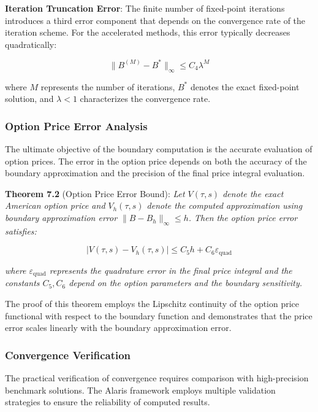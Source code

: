 \documentclass[
  11pt,
  11pt,
  letterpaper,
  onecolumn]{article}
\begin{document}
\textbf{Iteration Truncation Error}: The finite number of fixed-point
iterations introduces a third error component that depends on the
convergence rate of the iteration scheme. For the accelerated methods,
this error typically decreases quadratically:

\[\|B^{(M)} - B^*\|_{\infty} \leq C_4 \lambda^M \tag{7.3}\]

where \(M\) represents the number of iterations, \(B^*\) denotes the
exact fixed-point solution, and \(\lambda < 1\) characterizes the
convergence rate.

\subsubsection{Option Price Error
Analysis}\label{option-price-error-analysis}

The ultimate objective of the boundary computation is the accurate
evaluation of option prices. The error in the option price depends on
both the accuracy of the boundary approximation and the precision of the
final price integral evaluation.

\textbf{Theorem 7.2} (Option Price Error Bound): \emph{Let \(V(\tau,s)\)
denote the exact American option price and \(V_h(\tau,s)\) denote the
computed approximation using boundary approximation error
\(\|B - B_h\|_{\infty} \leq h\). Then the option price error satisfies:}

\[|V(\tau,s) - V_h(\tau,s)| \leq C_5 h + C_6 \varepsilon_{\text{quad}} \tag{7.4}\]

\emph{where \(\varepsilon_{\text{quad}}\) represents the quadrature
error in the final price integral and the constants \(C_5, C_6\) depend
on the option parameters and the boundary sensitivity.}

The proof of this theorem employs the Lipschitz continuity of the option
price functional with respect to the boundary function and demonstrates
that the price error scales linearly with the boundary approximation
error.

\subsubsection{Convergence Verification}\label{convergence-verification}

The practical verification of convergence requires comparison with
high-precision benchmark solutions. The Alaris framework employs
multiple validation strategies to ensure the reliability of computed
results.
\end{document}

